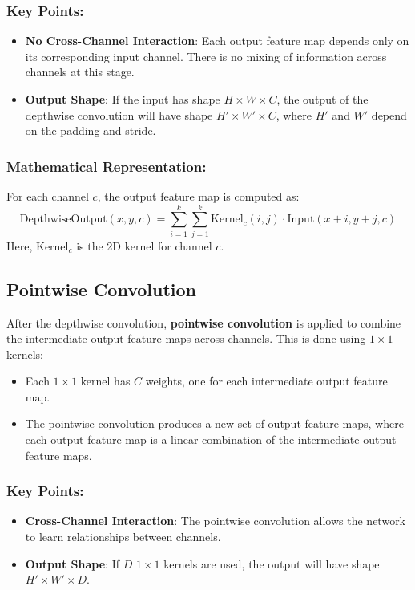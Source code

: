 \begin{notechapter}
\subsubsection{Key Points:}
\begin{itemize}
    \item \textbf{No Cross-Channel Interaction}: Each output feature 
    map depends only on its corresponding input channel. There is no 
    mixing of information across channels at this stage.
    \item \textbf{Output Shape}: If the input has shape \(H \times W 
    \times C\), the output of the depthwise convolution will have 
    shape \(H' \times W' \times C\), where \(H'\) and \(W'\) depend 
    on the padding and stride.
\end{itemize}

\subsubsection{Mathematical Representation:}
For each channel \(c\), the output feature map is computed as:
\[
\text{DepthwiseOutput}(x, y, c) = \sum_{i=1}^{k} \sum_{j=1}^{k} 
\text{Kernel}_{c}(i, j) \cdot \text{Input}(x+i, y+j, c)
\]
Here, \(\text{Kernel}_{c}\) is the 2D kernel for channel \(c\).

\subsection{Pointwise Convolution}

After the depthwise convolution, \textbf{pointwise convolution} is 
applied to combine the intermediate output feature maps across 
channels. This is done using \(1 \times 1\) kernels:
\begin{itemize}
    \item Each \(1 \times 1\) kernel has \(C\) weights, one for each 
    intermediate output feature map.
    \item The pointwise convolution produces a new set of output 
    feature maps, where each output feature map is a linear 
    combination of the intermediate output feature maps.
\end{itemize}

\subsubsection{Key Points:}
\begin{itemize}
    \item \textbf{Cross-Channel Interaction}: The pointwise 
    convolution allows the network to learn relationships between 
    channels.
    \item \textbf{Output Shape}: If \(D\) \(1 \times 1\) kernels are 
    used, the output will have shape \(H' \times W' \times D\).
\end{itemize}


\end{notechapter}

